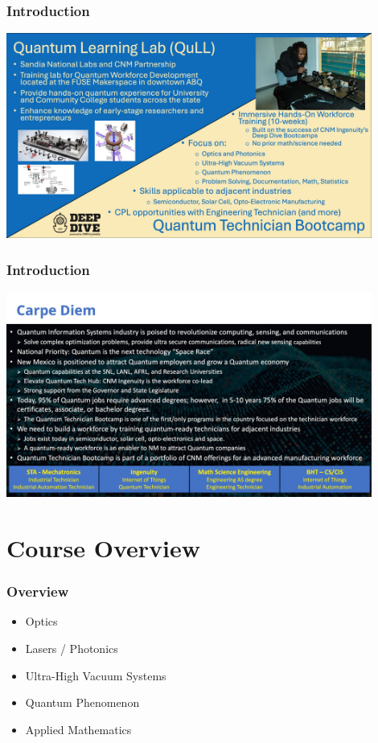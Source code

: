 \documentclass{beamer}
\begin{document}
\begin{frame}\frametitle{Introduction}
\begin{center}
\includegraphics[width=12cm]{fig/Slide14.jpeg}
\end{center}
\end{frame}



\begin{frame}\frametitle{Introduction}
\begin{center}
\includegraphics[width=12cm]{fig/Slide15.jpeg}
\end{center}
\end{frame}

\section{Course Overview}

\begin{frame}\frametitle{Overview}
\begin{itemize}
\item Optics
\item Lasers / Photonics
\item Ultra-High Vacuum Systems
\item Quantum Phenomenon
\item Applied Mathematics
\end{itemize}
\end{frame}
\end{document}
